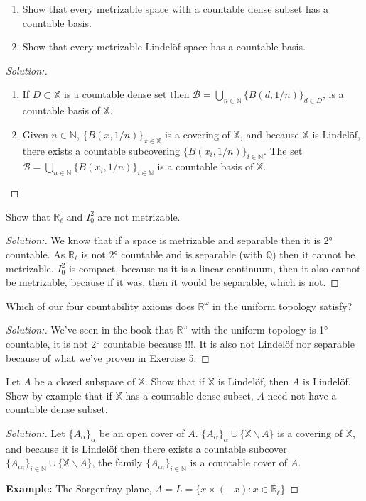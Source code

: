 \documentclass[a4paper,12pt, reqno]{article}
\theoremstyle{definition}
\newenvironment{exerr}[1]{
  \renewcommand\theexeralt{#1}
  \exeralt
}{\endexeralt}
\newenvironment{solution}{\begin{proof}[Solution:]}{\end{proof}}
\newcommand{\R}{\mathbb{R}}
\newcommand{\Q}{\mathbb{Q}}
\newcommand{\B}{\mathscr{B}}
\newcommand{\N}{\mathbb{N}}
\newcommand{\X}{\mathbb{X}}
\begin{document}
\begin{exerr}{5}\hfill
  \begin{enumerate}[label=(\alph*)]
    \item Show that every metrizable space with a countable dense subset has a countable basis.
    \item Show that every metrizable Lindelöf space has a countable basis.
  \end{enumerate}
\end{exerr}
\begin{solution}\hfill
  \begin{enumerate}[label=(\alph*)]
    \item If $D\subset\X$ is a countable dense set then $\B = \bigcup_{n\in\N}\{ B(d,1/n) \}_{d\in D}$, is a countable basis of $\X$.
    \item Given $n\in\N$, $\{ B(x,1/n) \}_{x\in\X}$ is a covering of $\X$, and because $\X$ is Lindelöf, there exists a countable subcovering $\{ B(x_{i},1/n) \}_{i\in\N}$. The set $\B = \bigcup_{n\in\N}\{ B(x_{i},1/n) \}_{i\in\N}$ is a countable basis of $\X$.
  \end{enumerate}
\end{solution}

\begin{exerr}{6}
  Show that $\R_{\ell}$ and $I_{0}^2$ are not metrizable.
\end{exerr}
\begin{solution}
  We know that if a space is metrizable and separable then it is 2° countable. As $\R_{\ell}$ is not 2° countable and is separable (with $\Q$) then it cannot be metrizable. $I_{0}^2$ is compact, because us it is a linear continuum, then it also cannot be metrizable, because if it was, then it would be separable, which is not.
\end{solution}

\begin{exerr}{8}
  Which of our four countability axioms does $\R^\omega$ in the uniform topology satisfy?
\end{exerr}
\begin{solution}
  We've seen in the book that $\R^\omega$ with the uniform topology is 1° countable, it is not 2° countable because !!!. It is also not Lindelöf nor separable because of what we've proven in Exercise 5.
\end{solution}

\begin{exerr}{9}
  Let $A$ be a closed subspace of $\X$. Show that if $\X$ is Lindelöf, then $A$ is Lindelöf. Show by example that if $\X$ has a countable dense subset, $A$ need not have a countable dense subset.
\end{exerr}
\begin{solution}
  Let $\{ A_{\alpha} \}_{\alpha}$ be an open cover of $A$. $\{ A_{\alpha} \}_{\alpha}\cup\{ \X\backslash A \}$ is a covering of $\X$, and because it is Lindelöf then there exists a countable subcover $\{ A_{\alpha_{i}} \}_{i\in\N}\cup\{ \X\backslash A \}$, the family $\{ A_{\alpha_{i}} \}_{i\in\N}$ is a countable cover of $A$.

  \textbf{Example:} The Sorgenfray plane, $A = L = \{ x\times(-x) : x\in\R_{\ell} \}$
\end{solution}
\end{document}

